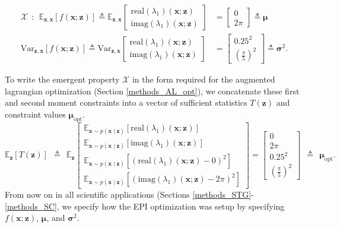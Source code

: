 \documentclass[11pt]{article}
\begin{document}
\begin{equation}
\begin{split}
\mathcal{X} ~~:~~\mathbb{E}_{\mathbf{z}, \mathbf{x}} \left[f(\mathbf{x}; \mathbf{z}) \right] \triangleq \mathbb{E}_{\mathbf{z}, \mathbf{x}} \begin{bmatrix} \text{real}(\lambda_1)(\mathbf{x}; \mathbf{z}) \\ \text{imag}(\lambda_1)(\mathbf{x}; \mathbf{z}) \end{bmatrix} &= \begin{bmatrix} 0 \\ 2\pi \end{bmatrix} \triangleq \bm{\mu} \\
\text{Var}_{\mathbf{z}, \mathbf{x}} \left[f(\mathbf{x}; \mathbf{z}) \right] \triangleq \text{Var}_{\mathbf{z}, \mathbf{x}} \begin{bmatrix} \text{real}(\lambda_1)(\mathbf{x}; \mathbf{z}) \\ \text{imag}(\lambda_1)(\mathbf{x}; \mathbf{z}) \end{bmatrix} &= \begin{bmatrix} 0.25^2 \\ (\frac{\pi}{5})^2 \end{bmatrix} \triangleq \bm{\sigma}^2.
\end{split}
\end{equation}

To write the emergent property $\mathcal{X}$ in the form required for the augmented lagrangian optimization (Section \ref{methods_AL_opt}), we concatenate these first and second moment constraints into a vector of sufficient statistics $T(\mathbf{z})$ and constraint values $\bm{\mu}_{\text{opt}}$.
\begin{equation}
 \mathbb{E}_{\mathbf{z}} \left[T(\mathbf{z}) \right] ~~ \triangleq ~~ \mathbb{E}_{\mathbf{z}}  \begin{bmatrix} \mathbb{E}_{\mathbf{x} \sim p(\mathbf{x} \mid \mathbf{z})} \left[ \text{real}(\lambda_1)(\mathbf{x}; \mathbf{z}) \right] \\ \mathbb{E}_{\mathbf{x} \sim p(\mathbf{x} \mid \mathbf{z})} \left[ \text{imag}(\lambda_1)(\mathbf{x}; \mathbf{z}) \right] \\ \mathbb{E}_{\mathbf{x} \sim p(\mathbf{x} \mid \mathbf{z})} \left[ (\text{real}(\lambda_1)(\mathbf{x}; \mathbf{z})-0)^2 \right]  \\ \mathbb{E}_{\mathbf{x} \sim p(\mathbf{x} \mid \mathbf{z})} \left[ (\text{imag}(\lambda_1)(\mathbf{x}; \mathbf{z})-2 \pi)^2 \right] \end{bmatrix} = \begin{bmatrix} 0 \\ 2 \pi \\ 0.25^2 \\ (\frac{\pi}{5})^2 \end{bmatrix} ~~ \triangleq ~~ \bm{\mu}_{\text{opt}}.
 \end{equation} 
 From now on in all scientific applications (Sections \ref{methods_STG}-\ref{methods_SC}, we specify how the EPI optimization was setup by specifying $f(\mathbf{x}; \mathbf{z})$, $\bm{\mu}$, and $\bm{\sigma}^2$.
 
\end{document}
